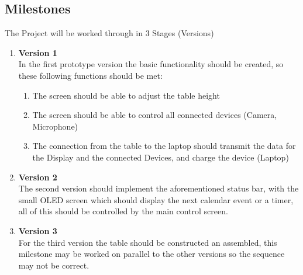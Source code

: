 \subsection{Milestones}
The Project will be worked through in 3 Stages (Versions)
\begin{enumerate}
	\item \textbf{Version 1}\\
	In the first prototype version the basic functionality should be created, so these following functions should be met: 
	\begin{enumerate}
		\item The screen should be able to adjust the table height
		\item The screen should be able to control all connected devices (Camera, Microphone)
		\item The connection from the table to the laptop should transmit the data for the Display and the connected Devices, and charge the device (Laptop)
	\end{enumerate}
	\item \textbf{Version 2}\\
	The second version should implement the aforementioned status bar, with the small OLED screen which should display the next calendar event or a timer, all of this should be controlled by the main control screen.
	
	\pagebreak
	 
	\item \textbf{Version 3}\\
	For the third version the table should be constructed an assembled, this milestone may be worked on parallel to the other versions so the sequence may not be correct. 
\end{enumerate}